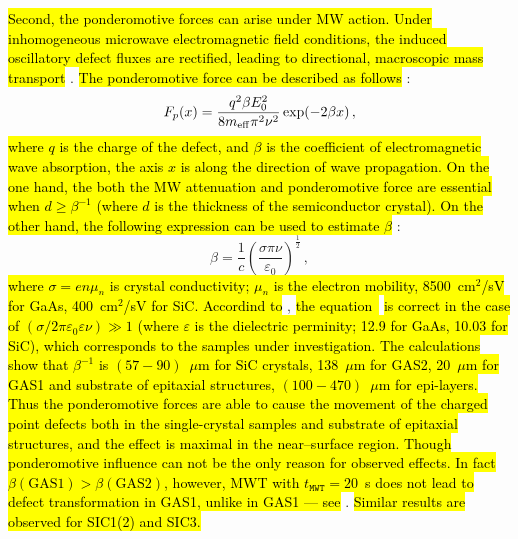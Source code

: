 \documentclass[10pt]{iopart}
\begin{document}
\hl{Second, the ponderomotive forces can arise under MW action.
Under inhomogeneous microwave electromagnetic field conditions, the
induced oscillatory defect fluxes are rectified,
leading to directional, macroscopic mass transport} \cite{MWT:Rew2001,MWT:PandForce97,MWT:PandForce92}.
\hl{The ponderomotive force can be described as follows} \cite{MWT:PandForce97,Milenin:SPQEO2020}:
\begin{equation}\label{eqFpan}
  F_p(x)=\frac{q^2\beta E_0^2}{8 m_{\rm eff} \pi^2 \nu^2} \exp(-2\beta x)\,,
\end{equation}
\hl{where
$q$ is the charge of the defect,
and $\beta$ is the coefficient of electromagnetic wave absorption,
the axis $x$ is along the direction of wave propagation.
On the one hand, the both the MW attenuation and ponderomotive force are essential
when $d\geq\beta^{-1}$
(where $d$ is the thickness of the semiconductor crystal).
On the other hand, the following expression can be used to estimate $\beta$} \cite{Milenin:SPQEO2020}:
\begin{equation}\label{eqBeta}
  \beta=\frac{1}{c}\left(\frac{\sigma\pi\nu}{\varepsilon_0}\right)^{\frac{1}{2}}\,,
\end{equation}
\hl{where
$\sigma=e n \mu_n$ is crystal conductivity;
$\mu_n$  is the electron mobility,
8500~cm$^2$/sV for GaAs, 400~cm$^2$/sV for SiC.
Accordind to} \cite{Milenin:SPQEO2020},
\hl{the equation~} \hl{is correct in the case of
$(\sigma/2\pi\varepsilon_0\varepsilon\nu)\gg1$
(where
$\varepsilon$ is the dielectric perminity;
12.9 for GaAs, 10.03 for SiC),
which corresponds to the samples under investigation.
The calculations show that
$\beta^{-1}$ is $(57-90)$~$\mu$m for SiC crystals,
138~$\mu$m for GAS2,
20~$\mu$m for GAS1 and substrate of epitaxial structures,
$(100-470)$~$\mu$m for epi-layers.
Thus the ponderomotive forces are able to cause the movement of the
charged point defects both in the single-crystal samples and
substrate of epitaxial structures, and the effect is maximal in the near--surface region.
Though ponderomotive influence can  not be the only reason for observed effects.
In fact $\beta(\mathrm{GAS1})>\beta(\mathrm{GAS2})$,
however, MWT with $t_\mathtt{MWT}=20$~s does not lead to defect transformation
in GAS1, unlike in GAS1 --- see} .
\hl{Similar results are observed for SIC1(2) and SIC3.}
\end{document}
